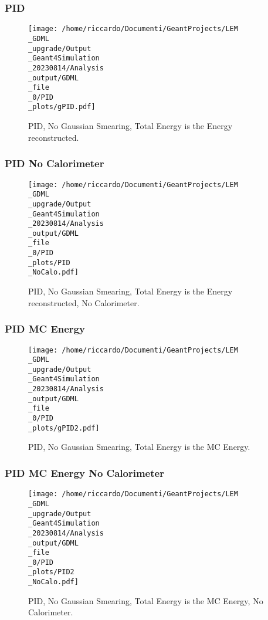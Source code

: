 \documentclass[8pt]{beamer}
\begin{document}
            \begin{frame}
                \frametitle{PID}
            
        \begin{figure}[h]
            \centering
            \texttt{[image: /home/riccardo/Documenti/GeantProjects/LEM\\\_GDML\\\_upgrade/Output\\\_Geant4Simulation\\\_20230814/Analysis\\\_output/GDML\\\_file\\\_0/PID\\\_plots/gPID.pdf]}
            \caption{PID, No Gaussian Smearing, Total Energy is the Energy reconstructed.}
        \end{figure}
        
            \end{frame}
            
            \begin{frame}
                \frametitle{PID No Calorimeter}
            
        \begin{figure}[h]
            \centering
            \texttt{[image: /home/riccardo/Documenti/GeantProjects/LEM\\\_GDML\\\_upgrade/Output\\\_Geant4Simulation\\\_20230814/Analysis\\\_output/GDML\\\_file\\\_0/PID\\\_plots/PID\\\_NoCalo.pdf]}
            \caption{PID, No Gaussian Smearing, Total Energy is the Energy reconstructed, No Calorimeter.}
        \end{figure}
        
            \end{frame}
            
            \begin{frame}
                \frametitle{PID MC Energy}
            
        \begin{figure}[h]
            \centering
            \texttt{[image: /home/riccardo/Documenti/GeantProjects/LEM\\\_GDML\\\_upgrade/Output\\\_Geant4Simulation\\\_20230814/Analysis\\\_output/GDML\\\_file\\\_0/PID\\\_plots/gPID2.pdf]}
            \caption{PID, No Gaussian Smearing, Total Energy is the MC Energy.}
        \end{figure}
        
            \end{frame}
            
            \begin{frame}
                \frametitle{PID MC Energy No Calorimeter}
            
        \begin{figure}[h]
            \centering
            \texttt{[image: /home/riccardo/Documenti/GeantProjects/LEM\\\_GDML\\\_upgrade/Output\\\_Geant4Simulation\\\_20230814/Analysis\\\_output/GDML\\\_file\\\_0/PID\\\_plots/PID2\\\_NoCalo.pdf]}
            \caption{PID, No Gaussian Smearing, Total Energy is the MC Energy, No Calorimeter.}
        \end{figure}
        
            \end{frame}
            
\end{document}
